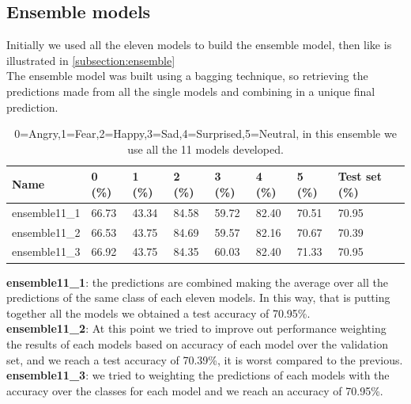 \documentclass[10pt,twocolumn,letterpaper]{article}
\begin{document}
\subsection{Ensemble models}
Initially we used all the eleven models to build the ensemble model, then like is illustrated in \ref{subsection:ensemble}\\
The ensemble model was built using a bagging technique, so retrieving the predictions made from all the single models and combining in a unique final prediction. 
\def\arraystretch{1.2}
\begin{table}[H]
   \scriptsize
   \begin{tabular}{L{1.1cm}C{0.5cm}C{0.5cm}C{0.5cm}C{0.5cm}C{0.5cm}C{0.5cm}C{0.8cm}}
      \hline
      Name          & 0 (\%) & 1 (\%) & 2 (\%) & 3 (\%) & 4 (\%) & 5 (\%) & Test set (\%) \\
      \hline\hline
      ensemble11\_1 & 66.73  & 43.34  & 84.58  & 59.72  & 82.40  & 70.51  & 70.95         \\
      ensemble11\_2 & 66.53  & 43.75  & 84.69  & 59.57  & 82.16  & 70.67  & 70.39         \\
      ensemble11\_3 & 66.92  & 43.75  & 84.35  & 60.03  & 82.40  & 71.33  & 70.95         \\
      \hline
   \end{tabular}
   \caption{ 0=Angry,1=Fear,2=Happy,3=Sad,4=Surprised,5=Neutral, in this ensemble we use all the 11 models developed.}
   \label{table:accuracymodelli}
\end{table}
\noindent\textbf{ensemble11\_1}: the predictions are combined making the average over all the predictions of the same class of each eleven models. In this way, that is putting together all the models we obtained a test accuracy of 70.95\%.\\
\textbf{ensemble11\_2}: At this point we tried to improve out performance weighting the results of each models based on accuracy of each model over the validation set, and we reach a test accuracy of 70.39\%, it is worst compared to the previous. \\
\textbf{ensemble11\_3}: we tried to weighting the predictions of each models with the accuracy over the classes for each model and we reach an accuracy of 70.95\%.  \\
\end{document}

